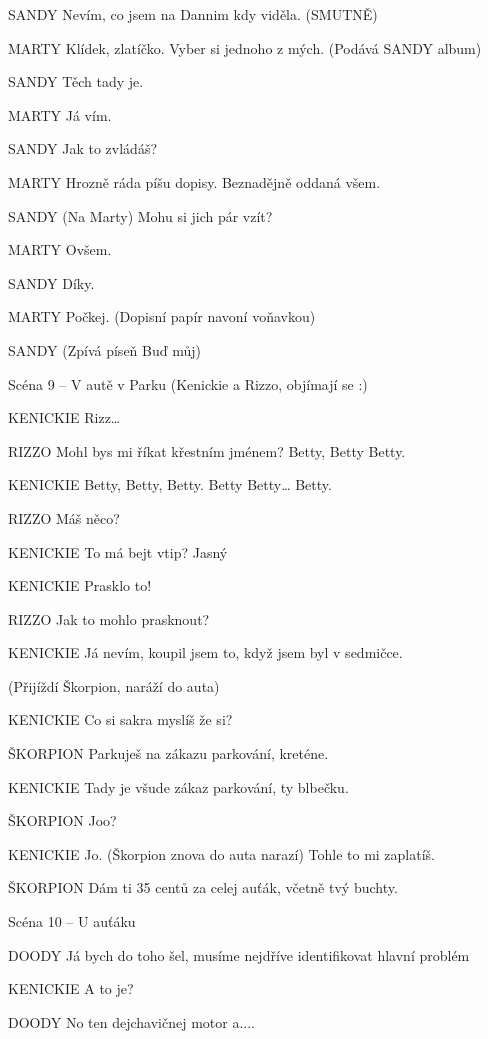SANDY        Nevím, co jsem na Dannim kdy viděla. (SMUTNĚ)

MARTY        Klídek, zlatíčko. Vyber si jednoho z mých. (Podává SANDY album)

SANDY        Těch tady je. 

MARTY        Já vím.

SANDY        Jak to zvládáš?

MARTY        Hrozně ráda píšu dopisy. Beznadějně oddaná všem.

SANDY        (Na Marty) Mohu si jich pár vzít?

MARTY        Ovšem.

SANDY        Díky.

MARTY        Počkej. (Dopisní papír navoní voňavkou)

SANDY        (Zpívá píseň Buď můj)

Scéna 9 – V autě v Parku (Kenickie a Rizzo, objímají se :)

KENICKIE        Rizz…

RIZZO        Mohl bys mi říkat křestním jménem? Betty, Betty Betty.

KENICKIE        Betty, Betty, Betty. Betty Betty… Betty.

RIZZO        Máš něco?

KENICKIE        To má bejt vtip? Jasný

KENICKIE        Prasklo to!

RIZZO        Jak to mohlo prasknout?

KENICKIE        Já nevím, koupil jsem to, když jsem byl v sedmičce.

(Přijíždí Škorpion, naráží do auta)

KENICKIE        Co si sakra myslíš že si?

ŠKORPION        Parkuješ na zákazu parkování, kreténe.

KENICKIE        Tady je všude zákaz parkování, ty blbečku.

ŠKORPION        Joo?

KENICKIE        Jo. (Škorpion znova do auta narazí) Tohle to mi zaplatíš.

ŠKORPION        Dám ti 35 centů za celej auťák, včetně tvý buchty.

Scéna 10 – U auťáku

DOODY        Já bych do toho šel, musíme nejdříve identifikovat hlavní problém

KENICKIE        A to je?

DOODY        No ten dejchavičnej motor a.... 

